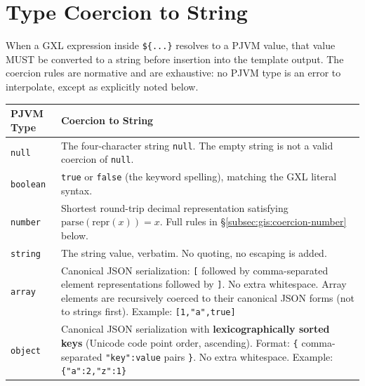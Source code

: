 \section{Type Coercion to String}
\label{sec:gis:coercion}

When a GXL expression inside \texttt{\$\{...\}} resolves to a PJVM value,
that value MUST be converted to a string before insertion into the template
output.
The coercion rules are normative and are exhaustive:
no PJVM type is an error to interpolate, except as explicitly noted below.

\begin{center}
\begin{tabular}{lp{9.5cm}}
\hline
\textbf{PJVM Type} & \textbf{Coercion to String} \\
\hline
\texttt{null}    & The four-character string \texttt{null}.
                   The empty string is not a valid coercion of \texttt{null}. \\
\texttt{boolean} & \texttt{true} or \texttt{false} (the keyword spelling),
                   matching the GXL literal syntax. \\
\texttt{number}  & Shortest round-trip decimal representation satisfying
                   \mbox{$\mathrm{parse}(\mathrm{repr}(x)) = x$}.
                   Full rules in \S\ref{subsec:gis:coercion-number} below. \\
\texttt{string}  & The string value, verbatim.
                   No quoting, no escaping is added. \\
\texttt{array}   & Canonical JSON serialization: \texttt{[} followed by
                   comma-separated element representations followed by
                   \texttt{]}.  No extra whitespace.
                   Array elements are recursively coerced to their canonical
                   JSON forms (not to strings first).
                   Example: \texttt{[1,"a",true]} \\
\texttt{object}  & Canonical JSON serialization with
                   \textbf{lexicographically sorted keys}
                   (Unicode code point order, ascending).
                   Format: \texttt{\{} comma-separated \texttt{"key":value}
                   pairs \texttt{\}}.  No extra whitespace.
                   Example: \texttt{\{"a":2,"z":1\}} \\
\hline
\end{tabular}
\end{center}

